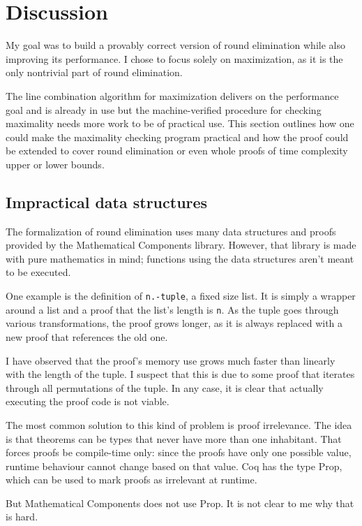 \documentclass[english, 12pt, a4paper, sci, a-1b, online]{aaltothesis}
\newcommand\icoq[1]{\texttt{#1}}
\begin{document}
\section{Discussion}

My goal was to build a provably correct version of round elimination while also improving its performance. I chose to focus solely on maximization, as it is the only nontrivial part of round elimination.

The line combination algorithm for maximization delivers on the performance goal and is already in use but the machine-verified procedure for checking maximality needs more work to be of practical use. This section outlines how one could make the maximality checking program practical and how the proof could be extended to cover round elimination or even whole proofs of time complexity upper or lower bounds.

\subsection{Impractical data structures}\label{badds}

The formalization of round elimination uses many data structures and proofs provided by the Mathematical Components library. However, that library is made with pure mathematics in mind; functions using the data structures aren't meant to be executed.

One example is the definition of \icoq{n.-tuple}, a fixed size list. It is simply a wrapper around a list and a proof that the list's length is \icoq{n}. As the tuple goes through various transformations, the proof grows longer, as it is always replaced with a new proof that references the old one.

I have observed that the proof's memory use grows much faster than linearly with the length of the tuple. I suspect that this is due to some proof that iterates through all permutations of the tuple. In any case, it is clear that actually executing the proof code is not viable.

The most common solution to this kind of problem is proof irrelevance. The idea is that theorems can be types that never have more than one inhabitant. That forces proofs be compile-time only: since the proofs have only one possible value, runtime behaviour cannot change based on that value. Coq has the type Prop, which can be used to mark proofs as irrelevant at runtime.

But Mathematical Components does not use Prop. It is not clear to me why that is hard.
\end{document}
